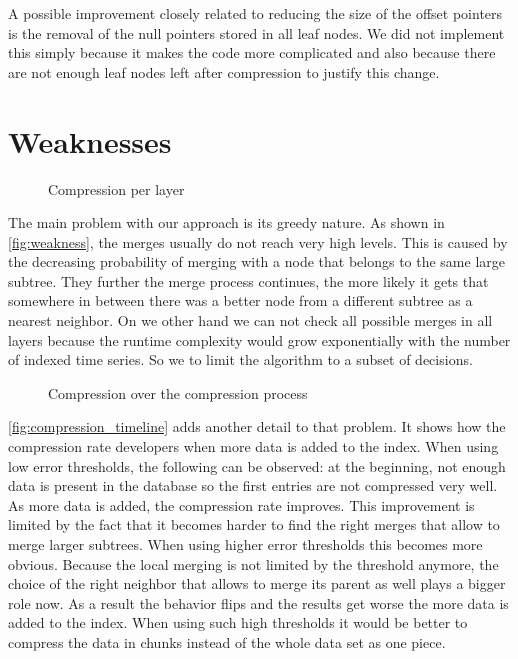 A possible improvement closely related to reducing the size of the offset pointers is the removal of the null pointers stored in all leaf nodes. We did not implement this simply because it makes the code more complicated and also because there are not enough leaf nodes left after compression to justify this change.



\section{Weaknesses}
\label{sec:algorithm:weak}

\begin{figure}
    \centering
    
    \caption{Compression per layer}\label{fig:weakness}
\end{figure}

The main problem with our approach is its greedy nature. As shown in \autoref{fig:weakness}, the merges usually do not reach very high levels. This is caused by the decreasing probability of merging with a node that belongs to the same large subtree. They further the merge process continues, the more likely it gets that somewhere in between there was a better node from a different subtree as a nearest neighbor. On we other hand we can not check all possible merges in all layers because the runtime complexity would grow exponentially with the number of indexed time series. So we to limit the algorithm to a subset of decisions.

\begin{figure}
    \centering
    
    \caption{Compression over the compression process}\label{fig:compression_timeline}
\end{figure}

\autoref{fig:compression_timeline} adds another detail to that problem. It shows how the compression rate developers when more data is added to the index. When using low error thresholds, the following can be observed: at the beginning, not enough data is present in the database so the first entries are not compressed very well. As more data is added, the compression rate improves. This improvement is limited by the fact that it becomes harder to find the right merges that allow to merge larger subtrees. When using higher error thresholds this becomes more obvious. Because the local merging is not limited by the threshold anymore, the choice of the right neighbor that allows to merge its parent as well plays a bigger role now. As a result the behavior flips and the results get worse the more data is added to the index. When using such high thresholds it would be better to compress the data in chunks instead of the whole data set as one piece.

